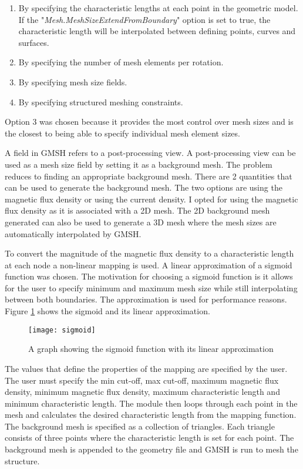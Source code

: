\begin{enumerate}
    \item By specifying the characteristic lengths at each point in the geometric model. If the "\textit{Mesh.MeshSizeExtendFromBoundary}" option is set to true, the characteristic length will be interpolated between defining points, curves and surfaces.
    \item By specifying the number of mesh elements per rotation.
    \item By specifying mesh size fields.
    \item By specifying structured meshing constraints.
\end{enumerate}
Option 3 was chosen because it provides the most control over mesh sizes and is the closest to being able to specify individual mesh element sizes. \par
A field in GMSH refers to a post-processing view. A post-processing view can be used as a mesh size field by setting it as a background mesh. The problem reduces to finding an appropriate background mesh. There are 2 quantities that can be used to generate the background mesh. The two options are using the magnetic flux density or using the current density. I opted for using the magnetic flux density as it is associated with a 2D mesh. The 2D background mesh generated can also be used to generate a 3D mesh where the mesh sizes are automatically interpolated by GMSH. \par
To convert the magnitude of the magnetic flux density to a characteristic length at each node a non-linear mapping is used. A linear approximation of a sigmoid function was chosen. The motivation for choosing a sigmoid function is it allows for the user to specify minimum and maximum mesh size while still interpolating between both boundaries. The approximation is used for performance reasons. Figure \ref{fig:sigmoid} shows the sigmoid and its linear approximation.
\begin{figure}[h]
    \centering
    \texttt{[image: sigmoid]}
    \caption{A graph showing the sigmoid function with its linear approximation}
    \label{fig:sigmoid}
\end{figure}
The values that define the properties of the mapping are specified by the user. The user must specify the min cut-off, max cut-off, maximum magnetic flux density, minimum magnetic flux density, maximum characteristic length and minimum characteristic length. The module then loops through each point in the mesh and calculates the desired characteristic length from the mapping function. The background mesh is specified as a collection of triangles. Each triangle consists of three points where the characteristic length is set for each point. The background mesh is appended to the geometry file and GMSH is run to mesh the structure. 

